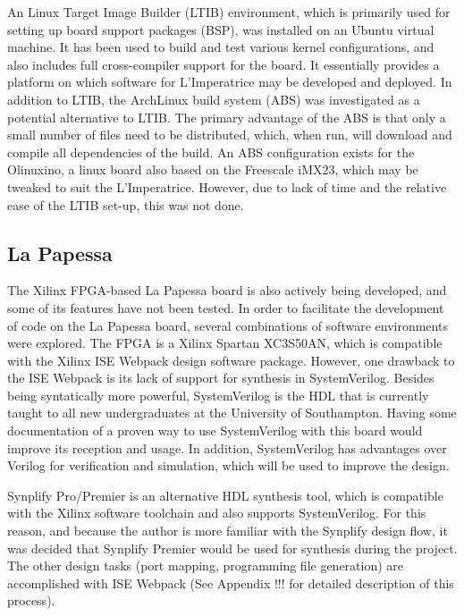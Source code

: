 		An Linux Target Image Builder (LTIB)  environment, which is primarily used for setting up board support packages (BSP), was installed on an Ubuntu virtual machine.  It has been used to build and test various kernel configurations, and also includes full cross-compiler support for the board.  It essentially provides a platform on which software for L'Imperatrice may be developed and deployed.
		In addition to LTIB, the ArchLinux build system (ABS) was investigated as a potential alternative to LTIB.  The primary advantage of the ABS is that only a small number of files need to be distributed, which, when run, will download and compile all dependencies of the build.  An ABS configuration exists for the Olinuxino, a linux board also based on the Freescale iMX23, which may be tweaked to suit the L'Imperatrice.  However, due to lack of time and the relative ease of the LTIB set-up, this was not done.

	\subsection{La Papessa} %
	\label{sub:la_papessa_dev}
		The Xilinx FPGA-based La Papessa board is also actively being developed, and some of its features have not been tested.  In order to facilitate the development of code on the La Papessa board, several combinations of software environments were explored.  The FPGA is a Xilinx Spartan XC3S50AN, which is compatible with the Xilinx ISE Webpack design software package.  However, one drawback to the ISE Webpack is its lack of support for synthesis in SystemVerilog. Besides being syntatically more powerful, SystemVerilog is the HDL that is currently taught to all new undergraduates at the University of Southampton. Having some documentation of a proven way to use SystemVerilog with this board would improve its reception and usage. In addition, SystemVerilog has advantages over Verilog for verification and simulation, which will be used to improve the design.

		Synplify Pro/Premier is an alternative HDL synthesis tool, which is compatible with the Xilinx software toolchain and also supports SystemVerilog. For this reason, and because the author is more familiar with the Synplify design flow, it was decided that Synplify Premier would be used for synthesis during the project.  The other design tasks (port mapping, programming file generation) are accomplished with ISE Webpack (See Appendix !!! for detailed description of this process).



